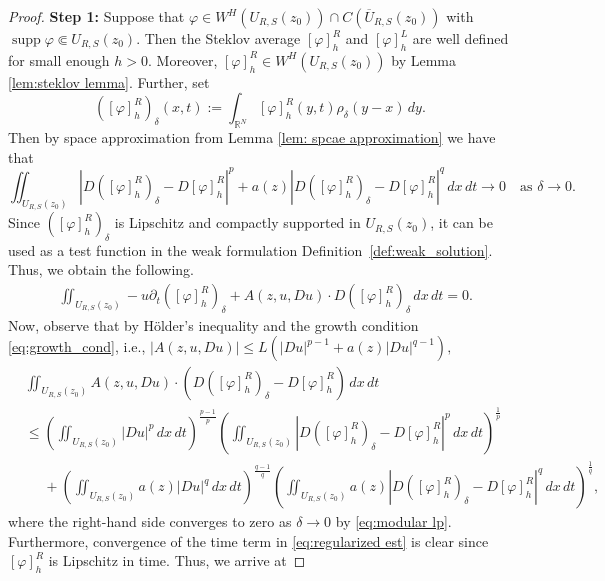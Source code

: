 \documentclass[10pt,a4paper]{amsart}
\numberwithin{equation}{section}
\newcommand{\RR}{\mathds{R}}
\DeclareMathOperator*{\supp}{supp}
\begin{document}
\begin{proof}
 \textbf{Step 1:} Suppose that $\varphi\in W^H(U_{R, S}(z_0))\cap C(\overline{U}_{R, S}(z_0))$ with $\supp \varphi \Subset U_{R, S}(z_0)$. Then the Steklov average $[\varphi]^R_h$ and $[\varphi]^L_h$ are well defined for small enough $h>0$. Moreover, $[\varphi]^R_h \in W^H(U_{R, S}(z_0))$ by Lemma \ref{lem:steklov lemma}.
Further, set
\[
([\varphi]^R_{h})_{\delta}(x,t):=\int_{\RR^{N}}[\varphi]^R_{h}(y,t)\rho_{\delta}(y-x)\, dy.
\]
Then by space approximation from Lemma \ref{lem: spcae approximation} we have that
\begin{equation}
\iint_{U_{R, S}(z_0)}\left|D([\varphi]^R_{h})_{\delta}-D[\varphi]^R_{h}\right|^{p}+a(z)\left|D([\varphi]^R_h)_{\delta}-D[\varphi]^R_{h}\right|^{q}\,dx\, dt\rightarrow0\quad\text{as }\delta\rightarrow0.\label{eq:modular lp}
\end{equation}
Since $([\varphi]^R_{h})_{\delta}$ is Lipschitz and compactly supported
in $U_{R, S}(z_0)$, it can be used as a test function in the weak formulation Definition~\ref{def:weak_solution}. Thus, we obtain the following.
\begin{equation}
\begin{aligned}
&\iint_{U_{R, S}(z_0)}-u\partial_{t}([\varphi]^R_{h})_{\delta}+A(z, u,  Du)\cdot D([\varphi]^R_{h})_{\delta}\, dx\, dt=0.\label{eq:regularized est}
\end{aligned}
\end{equation}
Now, observe that by H\"{o}lder's inequality and the growth condition \eqref{eq:growth_cond}, i.e., $|A(z, u, Du)|\leq L(|Du|^{p-1}+a(z)|Du|^{q-1}),$
\begin{align*}
 & \iint_{U_{R, S}(z_0)}A(z, u, Du)\cdot(D([\varphi]^R_{h})_{\delta}-D[\varphi]^R_{h})\, dx\, dt\\
 & \leq\left(\iint_{U_{R, S}(z_0)}\left|Du\right|^{p} \,dx\, dt\right)^{\frac{p-1}{p}}\left(\iint_{U_{R, S}(z_0)}\left|D([\varphi]^R_{h})_{\delta}-D[\varphi]^R_{h}\right|^{p} \,dx\, dt\right)^{\frac{1}{p}}\\
 & \phantom{\leq}+\left(\iint_{U_{R, S}(z_0)}a(z)\left|Du\right|^{q} \,dx\, dt\right)^{\frac{q-1}{q}}\left(\iint_{U_{R, S}(z_0)}a(z)\left|D([\varphi]^R_{h})_{\delta}-D[\varphi]^R_{h}\right|^{q} \,dx\, dt\right)^{\frac{1}{q}},
\end{align*}
where the right-hand side converges to zero as $\delta\rightarrow0$
by \eqref{eq:modular lp}. Furthermore, convergence of the time term
in \eqref{eq:regularized est} is clear since $[\varphi]^R_{h}$ is Lipschitz
in time. Thus, we arrive at

\end{proof}
\end{document}
